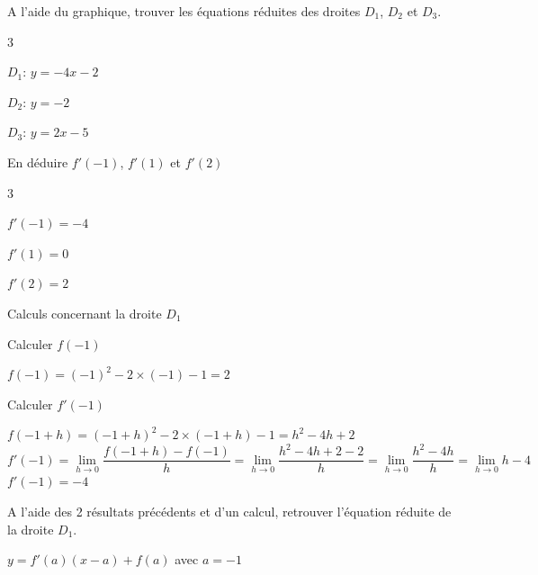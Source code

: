 \documentclass[12pt,a4paper]{article}  %
\begin{document}
\begin{enumMet}
	\item A l'aide du graphique, trouver les équations réduites des droites $D_1$, $D_2$ et $D_3$. \quad {}
	\begin{corrBox}
		\begin{multicols}{3}
			\begin{itemMet}
				\item $D_1$: $y=-4x-2$
				\item $D_2$: $y=-2$
				\item $D_3$: $y=2x-5$
			\end{itemMet}
		\end{multicols}
	\end{corrBox}
	\item En déduire $f'(-1)$, $f'(1)$ et $f'(2)$ \quad \bareme{1,5}
	\begin{corrBox}
		\begin{multicols}{3}
			\begin{itemMet}
				\item $f'(-1)=-4$
				\item $f'(1)=0$
				\item $f'(2)=2$
			\end{itemMet}
		\end{multicols}
	\end{corrBox}
	\newpage
	\item Calculs concernant la droite $D_1$
	\begin{enumMet}
	   	\item Calculer $f(-1)$ \quad \bareme{0,5}
	   	\begin{corrBox}
	   		$f(-1)=(-1)^{2}-2\times (-1)-1=2$	
	   	\end{corrBox}
	   	\item Calculer $f'(-1)$ \quad \bareme{2}
	   	\begin{corrBox}
	   		$f(-1+h)=(-1+h)^{2}-2\times (-1+h)-1=h^2-4h+2$\\
	   		$f'(-1)=\lim\limits_{h \rightarrow 0} \dfrac{f(-1+h)-f(-1)}{h}=\lim\limits_{h \rightarrow 0} \dfrac{h^2-4h+2-2}{h}=\lim\limits_{h \rightarrow 0} \dfrac{h^2-4h}{h}=\lim\limits_{h \rightarrow 0} h-4$\\
	   		$f'(-1)=-4$
	   	\end{corrBox}
	   	\item A l'aide des 2 résultats précédents et d'un calcul, retrouver l'équation réduite de la droite $D_1$. \quad \bareme{1}
	   	\begin{corrBox}
	   		$y=f'(a)(x-a)+f(a)$ avec $a=-1$\\

\end{corrBox}
\end{enumMet}
\end{enumMet}
\end{document}
